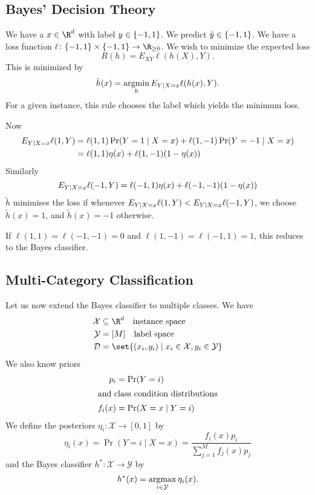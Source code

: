 
\subsection{Bayes' Decision Theory} \label{sec:bayes_decision}
We have a $x \in \R^d$ with label $y \in \{-1, 1\}$.
We predict $\hat{y} \in \{-1, 1\}$.
We have a loss function $\ell\colon \pms \times \pms \to \R_{\ge 0}$.
We wish to minimize the expected loss \[
    R(h) = E_{XY} \ell(h(X), Y).
\] This is minimized by \[
    \tilde{h}(x) = \operatorname*{argmin}_h E_{Y \mid X = x} \ell(h(x), Y).
\] For a given instance, this rule chooses the label which yields the
minimum loss.

Now \begin{align*}
    E_{Y \mid X = x} \ell(1, Y)
        &= \ell(1, 1) \Pr(Y = 1 \mid X = x)
            + \ell(1, -1) \Pr(Y = -1 \mid X = x) \\
        &= \ell(1, 1) \eta(x) + \ell(1, -1) (1 - \eta(x))
\end{align*}
Similarly \[
    E_{Y \mid X = x} \ell(-1, Y)
        = \ell(-1, 1) \eta(x) + \ell(-1, -1) (1 - \eta(x))
\] $\tilde h$ minimises the loss if whenever
$E_{Y \mid X = x} \ell(1, Y) < E_{Y \mid X = x} \ell(-1, Y)$,
we choose $\tilde{h}(x) = 1$, and $\tilde{h}(x) = -1$ otherwise.

If $\ell(1, 1) = \ell(-1, -1) = 0$ and $\ell(1, -1) = \ell(-1, 1) = 1$, this
reduces to the Bayes classifier.

\subsection{Multi-Category Classification} \label{sec:bayes:multi}
Let us now extend the Bayes classifier to multiple classes.
We have \begin{align*}
    \mathcal{X} &\subseteq \R^d \quad \text{instance space} \\
    \mathcal{Y} &= [M] \quad \text{label space} \\
    \mathcal{D} &= \set{(x_i, y_i) \mid x_i \in \mathcal{X},
        y_i \in \mathcal{Y}}
\end{align*}
We also know priors \begin{align*}
    p_i &= \Pr(Y = i) \\
    \intertext{and class condition distributions}
    f_i(x) &= \Pr(X = x \mid Y = i)
\end{align*}
We define the posteriors $\eta_i\colon \mathcal{X} \to [0, 1]$ by \[
    \eta_i(x) = \Pr(Y = i \mid X = x)
        = \frac{f_i(x) p_i}{\sum_{j = 1}^M f_j(x) p_j}
\] and the Bayes classifier $h^*\colon \mathcal{X} \to \mathcal{Y}$ by \[
    h^*(x) = \operatorname*{argmax}_{i \in \mathcal{Y}} \eta_i(x).
\]
